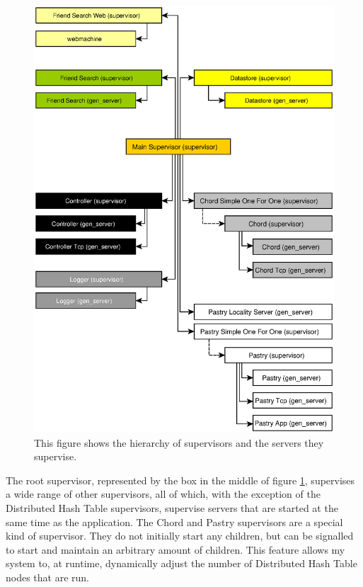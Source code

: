 \begin{figure}[!htb]
\begin{center}
	\includegraphics[width=0.9\linewidth]{illustrations/ClientSupervisionTree.eps}
  \caption{This figure shows the hierarchy of supervisors and the servers they supervise.}
  \label{figSupervisionTree}
\end{center}
\end{figure}

The root supervisor, represented by the box in the middle of figure \ref{figSupervisionTree}, supervises a wide range of other supervisors, all of which, with the exception of the Distributed Hash Table supervisors, supervise servers that are started at the same time as the application. 
The Chord and Pastry supervisors are a special kind of supervisor. They do not initially start any children, but can be signalled to start and maintain an arbitrary amount of children. This feature allows my system to, at runtime, dynamically adjust the number of Distributed Hash Table nodes that are run.


